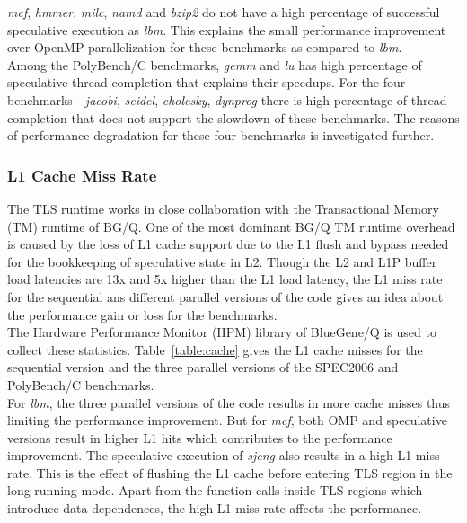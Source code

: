 \documentclass[10pt]{report}          %
\begin{document}
\textit{mcf}, \textit{hmmer}, \textit{milc}, \textit{namd} and \textit{bzip2} do not have a high percentage of successful speculative execution as \textit{lbm}. This explains the small performance improvement over OpenMP parallelization for these benchmarks as compared to \textit{lbm}. \\

Among the PolyBench/C benchmarks, \textit{gemm} and \textit{lu} has high percentage of speculative thread completion that explains their speedups.  For the four benchmarks - \textit{jacobi}, \textit{seidel}, \textit{cholesky}, \textit{dynprog} there is high percentage of thread completion that does not support the slowdown of these benchmarks.  The reasons of performance degradation for these four benchmarks is investigated further.

\subsubsection{L1 Cache Miss Rate}

The TLS runtime works in close collaboration with the Transactional Memory (TM) runtime of BG/Q.  One of the most dominant BG/Q TM runtime overhead is caused by the loss of L1 cache support due to the L1 flush and bypass needed for the bookkeeping of speculative
state in L2. Though the L2 and L1P buffer load latencies are 13x and 5x higher than the L1 load latency, the L1 miss rate for the sequential ans different parallel versions of the code gives an idea about the performance gain or loss for the benchmarks.\\

The Hardware Performance Monitor (HPM) library of BlueGene/Q is used to collect these statistics. Table~\ref{table:cache} gives the L1 cache misses for the sequential version and the three parallel versions of the SPEC2006 and PolyBench/C benchmarks.\\

For \textit{lbm}, the three parallel versions of the code results in more cache misses thus limiting the performance improvement.  But for \textit{mcf}, both OMP and speculative versions result in higher L1 hits which contributes to the performance improvement.  The speculative execution of \textit{sjeng} also results in a high L1 miss rate.  This is the effect of flushing the L1 cache before entering TLS region in the long-running mode.  Apart from the function calls inside TLS regions which introduce data dependences, the high L1 miss rate affects the performance. \\
\end{document}
